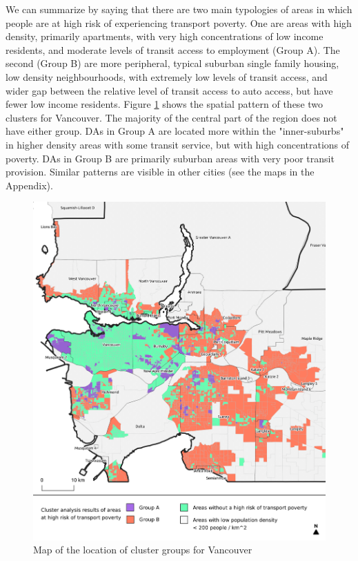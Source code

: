 \documentclass[11 pt, letterpaper]{article}
\begin{document}
{We can summarize by saying that there are two main typologies of areas in which people are at high risk of experiencing transport poverty. One are areas with high density, primarily apartments, with very high concentrations of low income residents, and moderate levels of transit access to employment (Group A). The second (Group B) are more peripheral, typical suburban single family housing, low density neighbourhoods, with extremely low levels of transit access, and wider gap between the relative level of transit access to auto access, but have fewer low income residents. Figure \ref{C_van_main} shows the spatial pattern of these two clusters for Vancouver. The majority of the central part of the region does not have either group. DAs in Group A are located more within the "inner-suburbs" in higher density areas with some transit service, but with high concentrations of poverty. DAs in Group B are primarily suburban areas with very poor transit provision. Similar patterns are visible in other cities (see the maps in the Appendix).

\begin{figure}[H]
	\caption{Map of the location of cluster groups for Vancouver} 
	\label{C_van_main}
	\centerline{\includegraphics[width=6.5in]{figures/cluster_maps/C_van}}
	\vspace{2mm}
\end{figure}



}
\end{document}
